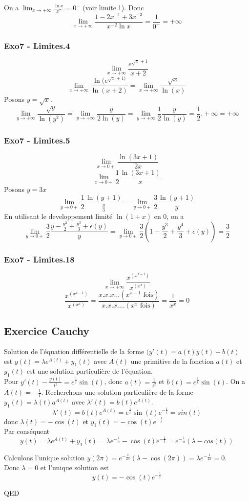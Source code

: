 \documentclass[]{book}
\theoremstyle{definition}
\begin{document}
On a $\lim_{x \to +\infty} \frac{\ln x}{x^2} = 0^{-}$ (voir limite.1).
Donc 
$$\lim_{x \to +\infty} \frac{1-2x^{-1}+3x^{-3}}{x^{-2}\ln x} = \frac{1}{0^{+}} = +\infty$$ 

\subsubsection*{Exo7 - Limites.4}
$$\lim_{x \to +\infty} \frac{e^{\sqrt{x}+1}}{x+2}$$
$$\lim_{x \to +\infty} \frac{\ln(e^{\sqrt{x}+1)}}{\ln(x+2)} = \lim_{x \to +\infty} \frac{\sqrt{x}}{\ln(x)}$$
Posons $y = \sqrt{x}$.
$$\lim_{y \to +\infty} \frac{\sqrt{y}}{\ln(y^2)} = \lim_{y \to +\infty} \frac{y}{2\ln(y)} = \lim_{y \to +\infty} \frac{1}{2}\frac{y}{\ln(y)} = \frac{1}{2} . +\infty = +\infty$$

\subsubsection*{Exo7 - Limites.5}
$$\lim_{x \to 0+} \frac{\ln(3x+1)}{2x}$$
$$\lim_{x \to 0+} \frac{1}{2}\frac{\ln(3x+1)}{x}$$
Posons $y=3x$
$$\lim_{y \to 0+} \frac{1}{2}\frac{\ln(y+1)}{\frac{y}{3}} = \lim_{y \to 0+} \frac{3}{2}\frac{\ln(y+1)}{y}$$
En utilisant le developpement limit\'e $\ln(1+x)$ en 0, on a
$$\lim_{y \to 0+} \frac{3}{2}\frac{y-\frac{y^2}{2}+ \frac{y^3}{3}+\epsilon(y)}{y} = \lim_{y \to 0+} \frac{3}{2}(1-\frac{y^3}{2} + \frac{y^4}{3}+\epsilon(y)) = \frac{3}{2}$$

\subsubsection*{Exo7 - Limites.18}
$$\lim_{x \to +\infty}\frac{x^{(x^{x-1})}}{x^{(x^{x})}}$$
$$\frac{x^{(x^{x-1})}}{x^{(x^{x})}} = \frac{x.x.x\ldots (x^{x-1} \textrm{ fois})}{x.x.x.\ldots (x^{x} \textrm{ fois})} =  \frac{1}{x^x} = 0$$


\newpage
\subsection*{Exercice Cauchy}
Solution de l'\'equation diff\'erentielle de la forme $(y'(t) = a(t)y(t) + b(t)$ est $y(t) = \lambda e^{A(t)}+y_1(t)$ avec $A(t)$ une primitive de la fonction $a(t)$ et $y_1(t)$ est une solution particuli\`ere de l'\'equation.\\

Pour $y'(t) - \frac{y(t)}{t^2} = e^{\frac{1}{t}}\sin(t)$, donc $a(t) = \frac{1}{t^2}$ et $b(t)= e^{\frac{1}{t}}\sin(t)$. On a $A(t) = -\frac{1}{t}$. Recherchons une  solution particuli\`ere de la forme $y_1(t) = \lambda(t)a^{A(t)}$ avec $\lambda'(t) = b(t)e^{A(t)}$.
$$\lambda'(t) = b(t)e^{A(t)} = e^{\frac{1}{t}}\sin(t)e^{-\frac{1}{t}} = sin(t)$$
donc $\lambda(t) =  -\cos(t)$ et $y_1(t) = -\cos(t)e^{-\frac{1}{t}}$\\
Par cons\'equent
$$y(t) = \lambda e^{A(t)}+y_1(t) = \lambda e^{-\frac{1}{n}} -\cos(t)e^{-\frac{1}{t}} = e^{-\frac{1}{n}}(\lambda-cos(t))$$

Calculons l'unique solution $y(2\pi) =  e^{-\frac{1}{2\pi}}(\lambda-\cos(2\pi)) = \lambda e^{-\frac{1}{2\pi}} = 0$.\\
Donc $\lambda = 0$ et l'unique solution est 
$$y(t) = -\cos(t)e^{-\frac{1}{t}}$$


QED
\end{document}

